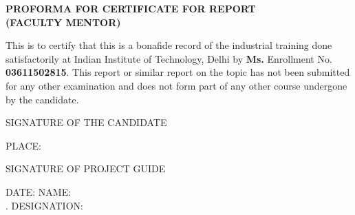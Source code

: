 \newpage
\begin{center}
\thispagestyle{empty}
\vspace{1.0cm}
\LARGE{\textsc {\textbf{PROFORMA FOR CERTIFICATE FOR REPORT\\(FACULTY MENTOR)}}}
\vspace{1.0cm}
\end{center}
\Large{This is to certify that this is a bonafide record of the industrial training done satisfactorily at Indian Institute of Technology, Delhi by \newline \textbf{Ms.}  Enrollment No. \textbf{03611502815}.\vspace{0.5cm}
\newline
This report or similar report on the topic has not been submitted for any other examination and does not form part of any other course \newline undergone by the candidate.}\vspace{1.0cm}\newline

\begin{flushright}
\hspace{5.0cm}\normalsize{SIGNATURE OF THE CANDIDATE}
\end{flushright}
\vspace{0.1cm}
\normalsize{PLACE:}                               
\vspace{0.8cm}
\begin{flushright}
\hspace{5.0cm}\normalsize{SIGNATURE OF PROJECT GUIDE}
\end{flushright}
\normalsize{DATE:}
\hspace{9.4cm}\normalsize{NAME:\vspace{0.4cm}\\}
\tiny{.}
\hspace{10.6cm}\normalsize{DESIGNATION:}



